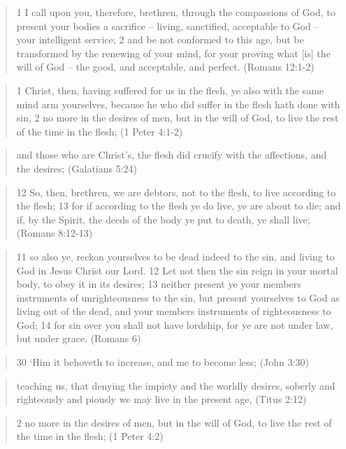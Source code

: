 \documentclass[11pt]{article}
\begin{document}
\begin{thebibliography}{37}
\begin{quote}
1 I call upon you, therefore, brethren, through the compassions of God, to present your bodies a sacrifice -- living, sanctified, acceptable to God -- your intelligent service;
2 and be not conformed to this age, but be transformed by the renewing of your mind, for your proving what [is] the will of God -- the good, and acceptable, and perfect.
(Romans 12:1-2)
\end{quote}
\begin{quote}
1 Christ, then, having suffered for us in the flesh, ye also with the same mind arm yourselves, because he who did suffer in the flesh hath done with sin,
2 no more in the desires of men, but in the will of God, to live the rest of the time in the flesh;
(1 Peter 4:1-2)
\end{quote}
\begin{quote}
and those who are Christ's, the flesh did crucify with the affections, and the desires;
(Galatians 5:24)
\end{quote}
\begin{quote}
12 So, then, brethren, we are debtors, not to the flesh, to live according to the flesh;
13 for if according to the flesh ye do live, ye are about to die; and if, by the Spirit, the deeds of the body ye put to death, ye shall live; (Romans 8:12-13)
\end{quote}
\begin{quote}
11 so also ye, reckon yourselves to be dead indeed to the sin, and living to God in Jesus Christ our Lord.
12 Let not then the sin reign in your mortal body, to obey it in its desires;
13 neither present ye your members instruments of unrighteousness to the sin, but present yourselves to God as living out of the dead, and your members instruments of righteousness to God;
14 for sin over you shall not have lordship, for ye are not under law, but under grace. (Romans 6)
\end{quote}
\begin{quote}
30 `Him it behoveth to increase, and me to become less;
(John 3:30)
\end{quote}
\begin{quote}
teaching us, that denying the impiety and the worldly desires, soberly and righteously and piously we may live in the present age,
(Titus 2:12)
\end{quote}
\begin{quote}
2 no more in the desires of men, but in the will of God, to live the rest of the time in the flesh;
(1 Peter 4:2)
\end{quote}
\begin{quote}

\end{quote}
\end{thebibliography}
\end{document}
